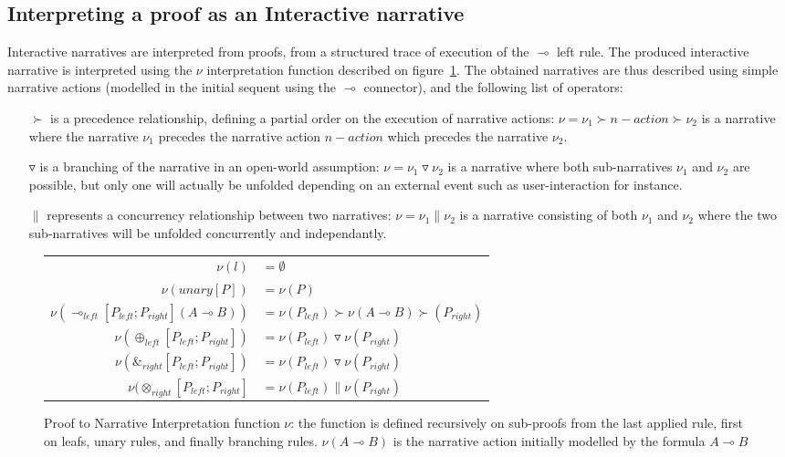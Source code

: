 \documentclass[runningheads,a4paper]{llncs}
\begin{document}
\subsection{Interpreting a proof as an Interactive narrative\label{subsec:proof_to_narrative}}
Interactive narratives are interpreted from proofs, from a structured trace of execution of the $\multimap$ left rule. The produced interactive narrative is interpreted using the $\nu$ interpretation function described on figure~\ref{fig:interpretation}. The obtained narratives are thus described using simple narrative actions (modelled in the initial sequent using the $\multimap$ connector), and the following list of operators:
\begin{itemize}
\item [$\succ$] is a precedence relationship, defining a partial order on the execution of narrative actions: $\nu=\nu_1\succ n-action \succ \nu_2$ is a narrative where the narrative $\nu_1$ precedes the narrative action $n-action$ which precedes the narrative $\nu_2$.
\item [$\triangledown$] is a branching of the narrative in an open-world assumption: $\nu=\nu_1\triangledown\nu_2$ is a narrative where both sub-narratives $\nu_1$ and $\nu_2$ are possible, but only one will actually be unfolded depending on an external event such as user-interaction for instance.
\item [$\|$] represents a concurrency relationship between two narratives: $\nu=\nu_1\|\nu_2$ is a narrative consisting of both $\nu_1$ and $\nu_2$ where the two sub-narratives will be unfolded concurrently and independantly.
\end{itemize}
\begin{figure}
\begin{tabular}{r l}
 $\nu(l)$                                              & $= \emptyset$\\
 $\nu(unary[P])$                                           & $ = \nu(P)$\\
 $\nu(\multimap_{left}[P_{left};P_{right}](A\multimap B))$ & $= \nu(P_{left}) \succ \nu(A \multimap B) \succ(P_{right})$\\
 $\nu(\oplus_{left}[P_{left};P_{right}])$                   & $= \nu(P_{left}) \triangledown \nu(P_{right})$\\
 $\nu(\&_{right}[P_{left};P_{right}])$                       & $= \nu(P_{left}) \triangledown \nu(P_{right})$\\
 $\nu(\otimes_{right}[P_{left};P_{right}]$                   & $= \nu(P_{left}) \| \nu(P_{right})$
\end{tabular}
\caption{Proof to Narrative Interpretation function $\nu$: the function is defined recursively on sub-proofs from the last applied rule, first on leafs, unary rules, and finally branching rules. $\nu(A\multimap B)$ is the narrative action initially modelled by the formula $A\multimap B$ \label{fig:interpretation}}
\end{figure}
\end{document}
